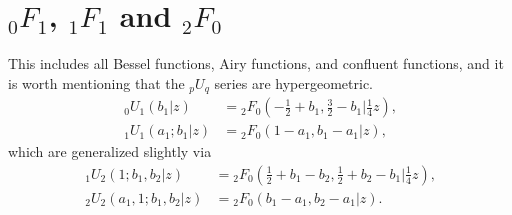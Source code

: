 \documentclass[12pt]{article}
\numberwithin{equation}{section}
\newcommand{\FFf}[5] {{}_{#1}{#2}_{#3} \left(#4 | {#5} \right)}
\begin{document}
\section{${}_0 F_1$, ${}_1 F_1$ and ${}_2 F_0$} This includes all Bessel functions, Airy functions, and confluent functions, and it is worth mentioning that the ${}_p U_{q}$ series are hypergeometric.
\begin{align*}
\FFf{0}{U}{1}{b_1}{z} &= \FFf{2}{F}{0}{-\tfrac{1}{2}+b_1, \tfrac{3}{2}-b_1}{\tfrac{1}{4}z}\text{,}\\
\FFf{1}{U}{1}{a_1;b_1}{z} &= \FFf{2}{F}{0}{1-a_1, b_1-a_1}{z}\text{,}
\end{align*}
which are generalized slightly via
\begin{equation}
\label{equ_pUq_as_hyp}
\begin{alignedat}{5}
\FFf{1}{U}{2}{1;b_1,b_2}{z} &= \FFf{2}{F}{0}{\tfrac{1}{2}+b_1-b_2, \tfrac{1}{2}+b_2-b_1}{\tfrac{1}{4}z}\text{,}\\
\FFf{2}{U}{2}{a_1,1;b_1,b_2}{z} &= \FFf{2}{F}{0}{b_1-a_1, b_2-a_1}{z}\text{.}
\end{alignedat}
\end{equation}
\end{document}
